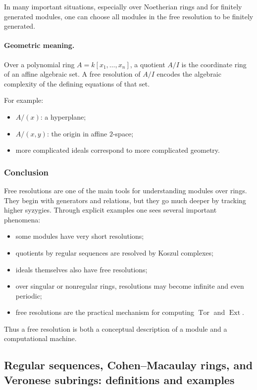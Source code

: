 \documentclass[12pt,a4paper]{article}
\theoremstyle{notespace}
\DeclareMathOperator{\Tor}{Tor}
\DeclareMathOperator{\Ext}{Ext}
\begin{document}
In many important situations, especially over Noetherian rings and for finitely generated modules, one can choose all modules in the free resolution to be finitely generated.

\paragraph{Geometric meaning.}

Over a polynomial ring \(A=k[x_1,\dots,x_n]\), a quotient \(A/I\) is the coordinate ring of an affine algebraic set. A free resolution of \(A/I\) encodes the algebraic complexity of the defining equations of that set.

For example:
\begin{itemize}[leftmargin=2em]
	\item \(A/(x)\): a hyperplane;
	\item \(A/(x,y)\): the origin in affine \(2\)-space;
	\item more complicated ideals correspond to more complicated geometry.
\end{itemize}

\subsubsection{Conclusion}

Free resolutions are one of the main tools for understanding modules over rings. They begin with generators and relations, but they go much deeper by tracking higher syzygies. Through explicit examples one sees several important phenomena:

\begin{itemize}[leftmargin=2em]
	\item some modules have very short resolutions;
	\item quotients by regular sequences are resolved by Koszul complexes;
	\item ideals themselves also have free resolutions;
	\item over singular or nonregular rings, resolutions may become infinite and even periodic;
	\item free resolutions are the practical mechanism for computing \(\Tor\) and \(\Ext\).
\end{itemize}

Thus a free resolution is both a conceptual description of a module and a computational machine.

\subsection{Regular sequences, Cohen--Macaulay rings, and Veronese subrings: definitions and examples}
\end{document}
